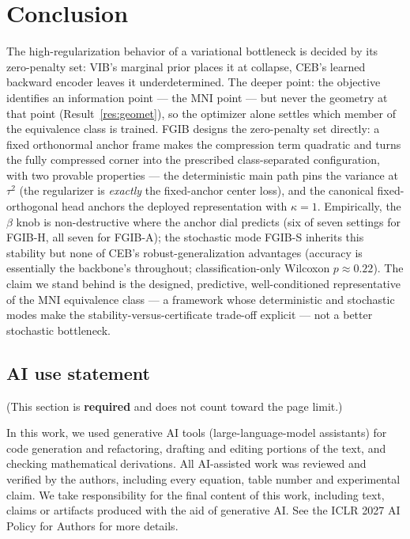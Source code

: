 \documentclass{article} %
\begin{document}
\section{Conclusion}

The high-regularization behavior of a variational bottleneck is decided by its
zero-penalty set: VIB's marginal prior places it at collapse, CEB's learned backward
encoder leaves it underdetermined. The deeper point: the objective identifies an
information point --- the MNI point --- but never the geometry at that point
(Result~\ref{res:geomet}), so the optimizer alone settles which member of the
equivalence class is trained. FGIB designs the zero-penalty set directly: a fixed
orthonormal anchor frame makes the compression term quadratic and turns the fully
compressed corner into the prescribed class-separated configuration, with two provable
properties --- the deterministic main path pins the variance at $\tau^2$ (the
regularizer is \emph{exactly} the fixed-anchor center loss), and the canonical
fixed-orthogonal head anchors the deployed representation with $\kappa=1$. Empirically,
the $\beta$ knob is non-destructive where the anchor dial predicts (six of seven
settings for FGIB-H, all seven for FGIB-A); the stochastic mode FGIB-S inherits this
stability but none of CEB's robust-generalization advantages (accuracy is essentially
the backbone's throughout; classification-only Wilcoxon $p\approx0.22$). The claim we
stand behind is the designed, predictive, well-conditioned representative of the MNI
equivalence class --- a framework whose deterministic and stochastic modes make the
stability-versus-certificate trade-off explicit --- not a better stochastic bottleneck.

\subsection*{AI use statement}

(This section is \textbf{required} and does not count toward the page limit.)

In this work, we used generative AI tools (large-language-model assistants) for code
generation and refactoring, drafting and editing portions of the text, and checking
mathematical derivations. All AI-assisted work was reviewed and verified by the authors,
including every equation, table number and experimental claim. We take responsibility
for the final content of this work, including text, claims or artifacts produced with
the aid of generative AI. See the ICLR 2027 AI Policy for Authors for more details.
\end{document}
